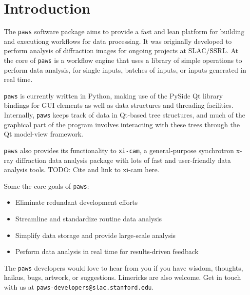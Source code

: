 \section{Introduction}
\label{sec:introduction}

The \verb|paws| software package aims to provide 
a fast and lean platform for building and executiong workflows for data processing.
It was originally developed to perform analysis of diffraction images 
for ongoing projects at SLAC/SSRL.
At the core of \verb|paws| is a workflow engine
that uses a library of simple operations
to perform data analysis, for single inputs, 
batches of inputs, or inputs generated in real time. 

\verb|paws| is currently written in Python,
making use of the PySide Qt library bindings
for GUI elements as well as data structures and threading facilities.
Internally, \verb|paws| keeps track of data in Qt-based tree structures,
and much of the graphical part of the program involves 
interacting with these trees through the Qt model-view framework.

\verb|paws| also provides its functionality to \verb|xi-cam|,
a general-purpose synchrotron x-ray diffraction data analysis package
with lots of fast and user-friendly data analysis tools.
TODO: Cite and link to xi-cam here.

Some the core goals of \verb|paws|:
\begin{itemize}
\item Eliminate redundant development efforts 
\item Streamline and standardize routine data analysis
\item Simplify data storage and provide large-scale analysis 
\item Perform data analysis in real time for results-driven feedback
\end{itemize}

The \verb|paws| developers would love to hear from you
if you have wisdom, thoughts, haikus, bugs, artwork, or suggestions.
Limericks are also welcome.
Get in touch with us at \verb|paws-developers@slac.stanford.edu|.


